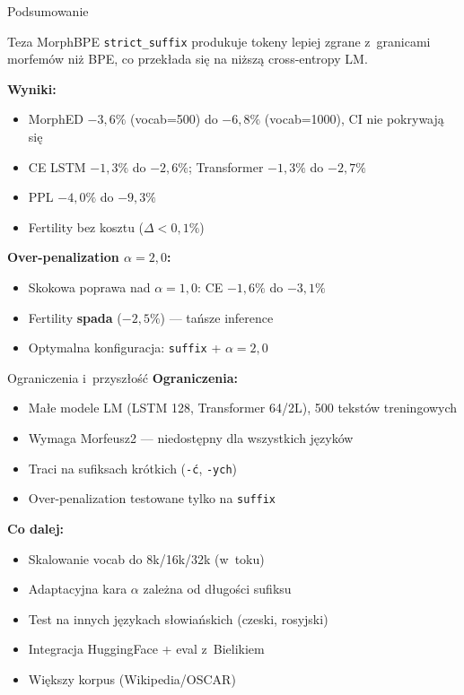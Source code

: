 \documentclass[aspectratio=169,11pt]{beamer}
\begin{document}
\begin{frame}{Podsumowanie}
\begin{block}{Teza}
MorphBPE \texttt{strict\_suffix} produkuje tokeny lepiej zgrane z~granicami morfemów niż BPE, co przekłada się na niższą cross-entropy LM.
\end{block}

\bigskip

\textbf{Wyniki:}
\begin{itemize}
  \item MorphED $-3{,}6\%$ (vocab=500) do $-6{,}8\%$ (vocab=1000), CI nie pokrywają się
  \item CE LSTM $-1{,}3\%$ do $-2{,}6\%$; Transformer $-1{,}3\%$ do $-2{,}7\%$
  \item PPL $-4{,}0\%$ do $-9{,}3\%$
  \item Fertility bez kosztu ($\Delta < 0{,}1\%$)
\end{itemize}

\bigskip

\textbf{Over-penalization $\alpha=2{,}0$:}
\begin{itemize}
  \item Skokowa poprawa nad $\alpha=1{,}0$: CE $-1{,}6\%$ do $-3{,}1\%$
  \item Fertility \textbf{spada} ($-2{,}5\%$) --- tańsze inference
  \item Optymalna konfiguracja: \texttt{suffix} + $\alpha=2{,}0$
\end{itemize}
\end{frame}

\begin{frame}{Ograniczenia i~przyszłość}
\textbf{Ograniczenia:}
\begin{itemize}
  \item Małe modele LM (LSTM 128, Transformer 64/2L), 500 tekstów treningowych
  \item Wymaga Morfeusz2 --- niedostępny dla wszystkich języków
  \item Traci na sufiksach krótkich (\texttt{-ć}, \texttt{-ych})
  \item Over-penalization testowane tylko na \texttt{suffix}
\end{itemize}

\bigskip

\textbf{Co dalej:}
\begin{itemize}
  \item Skalowanie vocab do 8k/16k/32k (w~toku)
  \item Adaptacyjna kara $\alpha$ zależna od długości sufiksu
  \item Test na innych językach słowiańskich (czeski, rosyjski)
  \item Integracja HuggingFace + eval z~Bielikiem
  \item Większy korpus (Wikipedia/OSCAR)
\end{itemize}
\end{frame}
\end{document}
